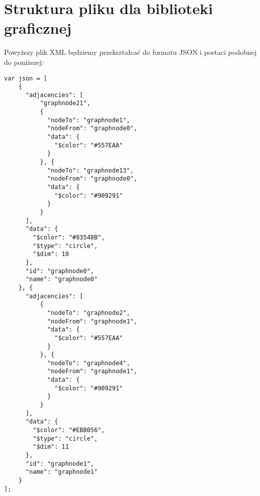 \section{Struktura pliku dla biblioteki graficznej}
Powyższy plik XML będziemy przekształcać do formatu JSON i postaci podobnej do poniższej:
\begin{verbatim}
var json = [  
    {  
      "adjacencies": [  
          "graphnode21",   
          {  
            "nodeTo": "graphnode1",  
            "nodeFrom": "graphnode0",  
            "data": {  
              "$color": "#557EAA"  
            }  
          }, {  
            "nodeTo": "graphnode13",  
            "nodeFrom": "graphnode0",  
            "data": {  
              "$color": "#909291"  
            }  
          }  
      ],  
      "data": {  
        "$color": "#83548B",  
        "$type": "circle",  
        "$dim": 10  
      },  
      "id": "graphnode0",  
      "name": "graphnode0"  
    }, {  
      "adjacencies": [  
          {  
            "nodeTo": "graphnode2",  
            "nodeFrom": "graphnode1",  
            "data": {  
              "$color": "#557EAA"  
            }  
          }, {  
            "nodeTo": "graphnode4",  
            "nodeFrom": "graphnode1",  
            "data": {  
              "$color": "#909291"  
            }  
          }
      ],  
      "data": {  
        "$color": "#EBB056",  
        "$type": "circle",  
        "$dim": 11  
      },  
      "id": "graphnode1",  
      "name": "graphnode1"  
    }
];
\end{verbatim}